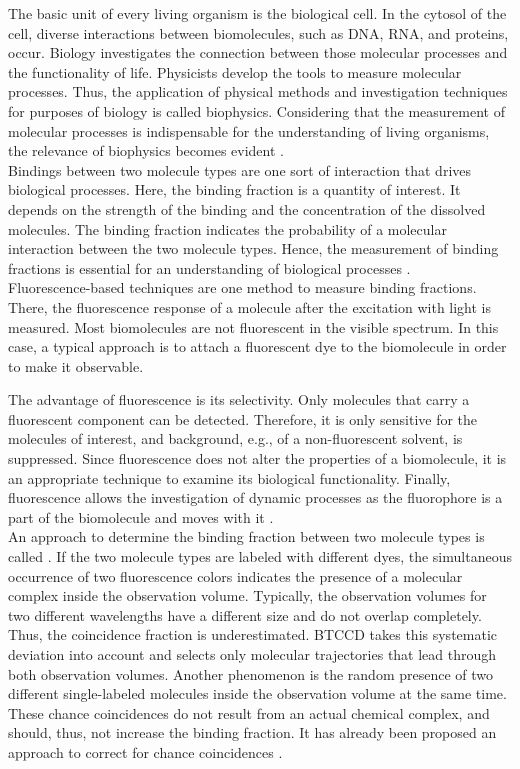 The basic unit of every living organism is the biological cell. In the cytosol of the cell, diverse interactions between biomolecules, such as DNA, RNA, and proteins, occur. Biology investigates the connection between those molecular processes and the functionality of life. Physicists develop the tools to measure molecular processes. Thus, the application of physical methods and investigation techniques for purposes of biology is called biophysics. Considering that the measurement of molecular processes is indispensable for the understanding of living organisms, the relevance of biophysics becomes evident \cite{Zaccai2017}.\\

Bindings between two molecule types are one sort of interaction that drives biological processes. Here, the binding fraction is a quantity of interest. It depends on the strength of the binding and the concentration of the dissolved molecules. The binding fraction indicates the probability of a molecular interaction between the two molecule types. Hence, the measurement of binding fractions is essential for an understanding of biological processes \cite{Lakowicz2006}. \\

Fluorescence-based techniques are one method to measure binding fractions. There, the fluorescence response of a molecule after the excitation with light is measured. Most bio\-mol\-e\-cules are not fluorescent in the visible spectrum. In this case, a typical approach is to attach a fluorescent dye to the biomolecule in order to make it observable.

The advantage of fluorescence is its selectivity. Only molecules that carry a fluorescent component can be detected. Therefore, it is only sensitive for the molecules of interest, and background, e.g., of a non-fluorescent solvent, is suppressed. Since fluorescence does not alter the properties of a biomolecule, it is an appropriate technique to examine its biological functionality. Finally, fluorescence allows the investigation of dynamic processes as the fluorophore is a part of the biomolecule and moves with it \cite{Lakowicz2006}. \\

An approach to determine the binding fraction between two molecule types is called . If the two molecule types are labeled with different dyes, the simultaneous occurrence of two fluorescence colors indicates the presence of a molecular complex inside the observation volume. Typically, the observation volumes for two different wavelengths have a different size and do not overlap completely. Thus, the coincidence fraction is underestimated. \gls{BTCCD} takes this systematic deviation into account and selects only molecular trajectories that lead through both observation volumes. Another phenomenon is the random presence of two different single-labeled molecules inside the observation volume at the same time. These chance coincidences do not result from an actual chemical complex, and should, thus, not increase the binding fraction. It has already been proposed an approach to correct for chance coincidences \cite{Hoefig2020}. 

